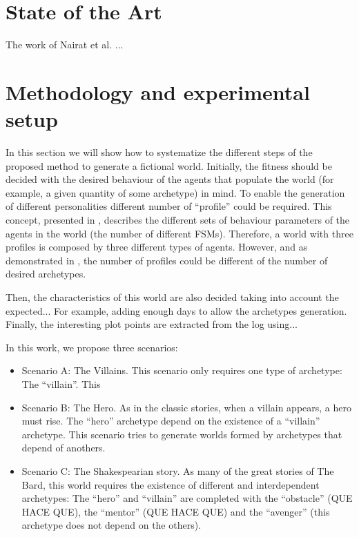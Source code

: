 \documentclass[runningheads,a4paper]{llncs}
\begin{document}
\section{State of the Art}
The work of Nairat et al. \cite{nairat:evolution} ...

\section{Methodology and experimental setup} %
\label{sec:met}

In this section we will show how to systematize the different steps
of
the proposed method to generate a fictional world. Initially, the
fitness should be decided with the desired behaviour of the
agents that populate the world (for example, a given quantity of some
archetype) in mind. To enable the generation of different
personalities %
different number of ``profile'' could be required. This concept,
presented in \cite{}, describes the different sets of behaviour
parameters of the agents in the world (the number of different
FSMs). Therefore, a world with three profiles is composed by three different
types of agents. However, and as demonstrated in \cite{garcia14my}, the
number of profiles could be different of the number of desired
archetypes. %

Then, the characteristics of this world are also decided taking into account the expected... For example, adding enough days to allow the archetypes generation. Finally, the interesting plot points are extracted from the log using... %

In this work, we propose three scenarios:
\begin{itemize}
\item Scenario A: The Villains. This scenario only requires one type of archetype: The ``villain''. This %
\item Scenario B: The Hero. As in the classic stories, when a villain appears, a hero must rise. The ``hero'' archetype depend on the existence of a ``villain'' archetype. This scenario tries to generate worlds formed by archetypes that depend of anothers.
\item Scenario C: The Shakespearian story. As many of the great stories of The Bard, this world requires the existence of different and interdependent archetypes: The ``hero'' and ``villain'' are completed with the ``obstacle'' (QUE HACE QUE), the  ``mentor'' (QUE HACE QUE) and the ``avenger'' (this archetype does not depend on the others).

\end{itemize}
\end{document}
